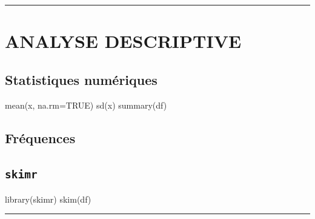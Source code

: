\documentclass[
  french,
  8pt,
  letterpaper,
  DIV=11,
  numbers=noendperiod]{scrartcl}
\newenvironment{Shaded}{\begin{snugshade}}{\end{snugshade}}
\newcommand{\AttributeTok}[1]{\textcolor[rgb]{0.40,0.45,0.13}{#1}}
\newcommand{\ConstantTok}[1]{\textcolor[rgb]{0.56,0.35,0.01}{#1}}
\newcommand{\FunctionTok}[1]{\textcolor[rgb]{0.28,0.35,0.67}{#1}}
\newcommand{\NormalTok}[1]{\textcolor[rgb]{0.00,0.23,0.31}{#1}}
\newcommand{\SpecialCharTok}[1]{\textcolor[rgb]{0.37,0.37,0.37}{#1}}
\begin{document}
\begin{center}\rule{0.5\linewidth}{0.5pt}\end{center}

\section{ ANALYSE DESCRIPTIVE}\label{analyse-descriptive}

\subsection{Statistiques numériques}\label{statistiques-numuxe9riques}

\begin{Shaded}
\begin{Highlighting}[]
\FunctionTok{mean}\NormalTok{(x, }\AttributeTok{na.rm=}\ConstantTok{TRUE}\NormalTok{)}
\FunctionTok{sd}\NormalTok{(x)}
\FunctionTok{summary}\NormalTok{(df)}
\end{Highlighting}
\end{Shaded}

\subsection{Fréquences}\label{fruxe9quences}

\begin{Shaded}
\end{Shaded}

\subsection{\texorpdfstring{\texttt{skimr}}{skimr}}\label{skimr}

\begin{Shaded}
\begin{Highlighting}[]
\FunctionTok{library}\NormalTok{(skimr)}
\FunctionTok{skim}\NormalTok{(df)}
\end{Highlighting}
\end{Shaded}

\begin{center}\rule{0.5\linewidth}{0.5pt}\end{center}
\end{document}
